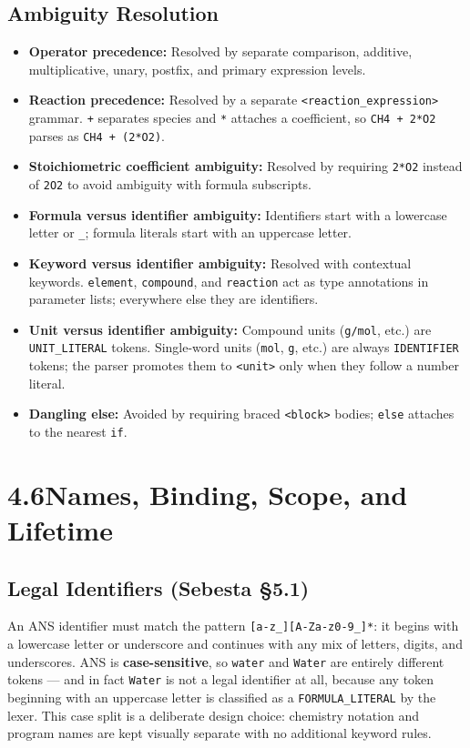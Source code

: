 \documentclass[11pt,a4paper]{article}
\newcommand{\code}[1]{\texttt{#1}}
\begin{document}
\subsection{Ambiguity Resolution}
\begin{itemize}
    \item \textbf{Operator precedence:} Resolved by separate comparison, additive, multiplicative, unary, postfix, and primary expression levels.
    \item \textbf{Reaction precedence:} Resolved by a separate \code{<reaction\_expression>} grammar. \code{+} separates species and \code{*} attaches a coefficient, so \code{CH4 + 2*O2} parses as \code{CH4 + (2*O2)}.
    \item \textbf{Stoichiometric coefficient ambiguity:} Resolved by requiring \code{2*O2} instead of \code{2O2} to avoid ambiguity with formula subscripts.
    \item \textbf{Formula versus identifier ambiguity:} Identifiers start with a lowercase letter or \code{\_}; formula literals start with an uppercase letter.
    \item \textbf{Keyword versus identifier ambiguity:} Resolved with contextual keywords. \code{element}, \code{compound}, and \code{reaction} act as type annotations in parameter lists; everywhere else they are identifiers.
    \item \textbf{Unit versus identifier ambiguity:} Compound units (\code{g/mol}, etc.) are \code{UNIT\_LITERAL} tokens. Single-word units (\code{mol}, \code{g}, etc.) are always \code{IDENTIFIER} tokens; the parser promotes them to \code{<unit>} only when they follow a number literal.
    \item \textbf{Dangling else:} Avoided by requiring braced \code{<block>} bodies; \code{else} attaches to the nearest \code{if}.
\end{itemize}

\newpage
\section{4.6\quad Names, Binding, Scope, and Lifetime}

\subsection{Legal Identifiers (Sebesta \S5.1)}
An ANS identifier must match the pattern \code{[a-z\_][A-Za-z0-9\_]*}: it begins with a lowercase letter or underscore and continues with any mix of letters, digits, and underscores. ANS is \textbf{case-sensitive}, so \code{water} and \code{Water} are entirely different tokens --- and in fact \code{Water} is not a legal identifier at all, because any token beginning with an uppercase letter is classified as a \code{FORMULA\_LITERAL} by the lexer. This case split is a deliberate design choice: chemistry notation and program names are kept visually separate with no additional keyword rules.
\end{document}
